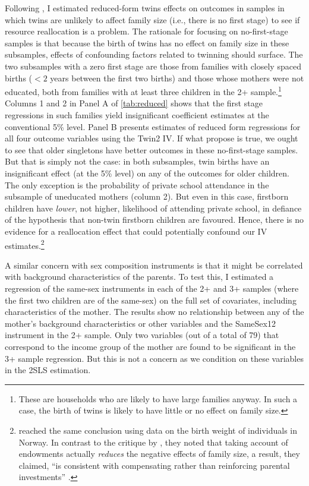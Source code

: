 Following \textcite{angrist_multiple_2010}, I estimated reduced-form twins effects on outcomes in samples in which twins are unlikely to affect family size (i.e., there is no first stage) to see if resource reallocation is a problem. The rationale for focusing on no-first-stage samples is that because the birth of twins has no effect on family size in these subsamples, effects of confounding factors related to twinning should surface. The two subsamples with a zero first stage are those from families with closely spaced births ($ <2 $ years between the first two births) and those whose mothers were not educated, both from families with at least three children in the 2+ sample.\footnote{ These are households who are likely to have large families anyway. In such a case, the birth of twins is likely to have little or no effect on family size. }  Columns 1 and 2 in Panel A of \autoref{tab:reduced} shows that the first stage regressions in such families yield insignificant coefficient estimates at the conventional 5\% level. Panel B presents estimates of reduced form regressions for all four outcome variables using the Twin2 IV. If what \textcite{rosenzweig_population_2009} propose is true, we ought to see that older singletons have better outcomes in these no-first-stage samples. But that is simply not the case: in both subsamples, twin births have an insignificant effect (at the 5\% level) on any of the outcomes for older children. The only exception is the probability of private school attendance in the subsample of uneducated mothers (column 2). But even in this case, firstborn children have \textit{lower}, not higher, likelihood of attending private school, in defiance of the hypothesis that non-twin firstborn children are favoured. Hence, there is no evidence for a reallocation effect that could potentially confound our IV estimates.\footnote{ \textcite{Black2010} reached the same conclusion using data on the birth weight of individuals in Norway. In contrast to the critique by \textcite{rosenzweig_population_2009}, they noted that taking account of endowments actually \textit{reduces} the negative effects of family size, a result, they claimed, \enquote{is consistent with compensating rather than reinforcing parental investments} \parencite[p.~35]{Black2010}. } 
  
A similar concern with sex composition instruments is that it might be correlated with background characteristics of the parents. To test this, I estimated a regression of the same-sex instruments in each of the 2+ and 3+ samples (where the first two children are of the same-sex) on the full set of covariates, including characteristics of the mother. The results show no relationship between any of the mother’s background characteristics or other variables and the SameSex12 instrument in the 2+ sample. Only two variables (out of a total of 79) that correspond to the income group of the mother are found to be significant in the 3+ sample regression. But this is not a concern as we condition on these variables in the 2SLS estimation.

